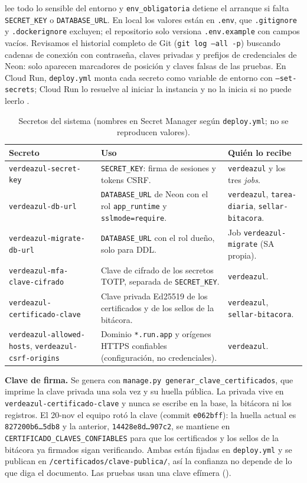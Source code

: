 \documentclass[10pt,letterpaper]{article}
\newcommand{\cod}[1]{\texttt{#1}}
\begin{document}
 lee todo lo sensible del entorno y \cod{env\_obligatoria} detiene el arranque si falta \cod{SECRET\_KEY} o \cod{DATABASE\_URL}. En local los valores están en \cod{.env}, que \cod{.gitignore} y \cod{.dockerignore} excluyen; el repositorio solo versiona \cod{.env.example} con campos vacíos. Revisamos el historial completo de Git (\cod{git log --all -p}) buscando cadenas de conexión con contraseña, claves privadas y prefijos de credenciales de Neon: solo aparecen marcadores de posición y claves falsas de las pruebas. En Cloud Run, \cod{deploy.yml} monta cada secreto como variable de entorno con \cod{--set-secrets}; Cloud Run lo resuelve al iniciar la instancia y no la inicia si no puede leerlo \cite{gcp-run-secrets}.

\begin{table}[ht]
\centering\footnotesize
\caption{Secretos del sistema (nombres en Secret Manager según \cod{deploy.yml}; no se reproducen valores).}
\label{tab:secretos}
\begin{tabularx}{\linewidth}{@{}P{4.3cm}YP{4.2cm}@{}}
\toprule
\textbf{Secreto} & \textbf{Uso} & \textbf{Quién lo recibe}\\
\midrule
\cod{verdeazul-secret-key} & \cod{SECRET\_KEY}: firma de sesiones y tokens CSRF. & \cod{verdeazul} y los tres \emph{jobs}.\\
\cod{verdeazul-db-url} & \cod{DATABASE\_URL} de Neon con el rol \cod{app\_runtime} y \cod{sslmode=require}. & \cod{verdeazul}, \cod{tarea-diaria}, \cod{sellar-bitacora}.\\
\cod{verdeazul-migrate-db-url} & \cod{DATABASE\_URL} con el rol dueño, solo para DDL. & Job \cod{verdeazul-migrate} (SA propia).\\
\cod{verdeazul-mfa-clave-cifrado} & Clave de cifrado de los secretos TOTP, separada de \cod{SECRET\_KEY}. & \cod{verdeazul}.\\
\cod{verdeazul-certificado-clave} & Clave privada Ed25519 de los certificados y de los sellos de la bitácora. & \cod{verdeazul}, \cod{sellar-bitacora}.\\
\cod{verdeazul-allowed-hosts}, \cod{verdeazul-csrf-origins} & Dominio \cod{*.run.app} y orígenes HTTPS confiables (configuración, no credenciales). & \cod{verdeazul}.\\
\bottomrule
\end{tabularx}
\end{table}

\textbf{Clave de firma.} Se genera con \cod{manage.py generar\_clave\_certificados}, que imprime la clave privada una sola vez y su huella pública. La privada vive en \cod{verdeazul-certificado-clave} y nunca se escribe en la base, la bitácora ni los registros. El 20-nov el equipo rotó la clave (commit \cod{e062bff}): la huella actual es \cod{827200b6\ldots5db8} y la anterior, \cod{14428e8d\ldots907c2}, se mantiene en \cod{CERTIFICADO\_CLAVES\_CONFIABLES} para que los certificados y los sellos de la bitácora ya firmados sigan verificando. Ambas están fijadas en \cod{deploy.yml} y se publican en \cod{/certificados/clave-publica/}, así la confianza no depende de lo que diga el documento. Las pruebas usan una clave efímera ().
\end{document}
